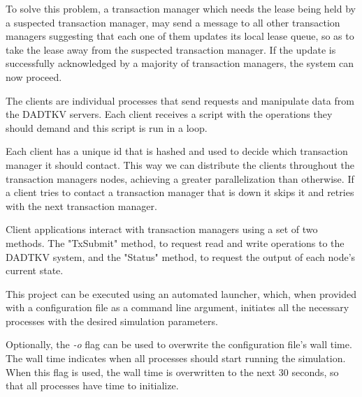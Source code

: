 \documentclass[times, 10pt,twocolumn]{article}
\begin{document}
To solve this problem, a transaction manager which needs the lease being held by a suspected transaction manager, may send a message to all other transaction managers suggesting that each one of them updates its local lease queue, so as to take the lease away from the suspected transaction manager. If the update is successfully acknowledged by a majority of transaction managers, the system can now proceed.

The clients are individual processes that send requests and manipulate data from the DADTKV servers. Each client receives a script with the operations they should demand and this script is run in a loop.

Each client has a unique id that is hashed and used to decide which transaction manager it should contact. This way we can distribute the clients throughout the transaction managers nodes, achieving a greater parallelization than otherwise. If a client tries to contact a transaction manager that is down it skips it and retries with the next transaction manager.

Client applications interact with transaction managers using a set of two methods. The "TxSubmit" method, to request read and write operations to the DADTKV system, and the "Status" method, to request the output of each node's current state.

This project can be executed using an automated launcher, which, when provided with a configuration file as a command line argument, initiates all the necessary processes with the desired simulation parameters.

Optionally, the \textit{-o} flag can be used to overwrite the configuration file's wall time. The wall time indicates when all processes should start running the simulation. When this flag is used, the wall time is overwritten to the next 30 seconds, so that all processes have time to initialize. 

\nocite{protobuf, paxos}


\end{document}

